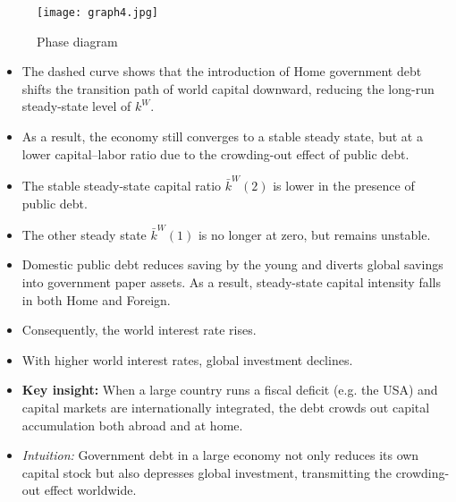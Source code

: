 \documentclass[12pt]{article}
\begin{document}
\begin{figure}[H]
    \centering
    \texttt{[image: graph4.jpg]}
    \caption{Phase diagram}
    \label{fig:phase_k_dynamics}
\end{figure}

\begin{itemize}
  \item The dashed curve shows that the introduction of Home government debt shifts the transition path of world capital downward, reducing the long-run steady-state level of $k^W$.  

  \item As a result, the economy still converges to a stable steady state, but at a lower capital–labor ratio due to the crowding-out effect of public debt.  
\end{itemize}

\begin{itemize}
  \item The stable steady-state capital ratio $\bar{k}^W(2)$ is lower in the presence of public debt.

  \item The other steady state $\bar{k}^W(1)$ is no longer at zero, but remains unstable.

  \item Domestic public debt reduces saving by the young and diverts global savings into government paper assets. As a result, steady-state capital intensity falls in both Home and Foreign.

  \item Consequently, the world interest rate rises.

  \item With higher world interest rates, global investment declines.

  \item \textbf{Key insight:} When a large country runs a fiscal deficit (e.g. the USA) and capital markets are internationally integrated, the debt crowds out capital accumulation both abroad and at home.
  
  \item \textit{Intuition:} Government debt in a large economy not only reduces its own capital stock but also depresses global investment, transmitting the crowding-out effect worldwide.
\end{itemize}
\end{document}
